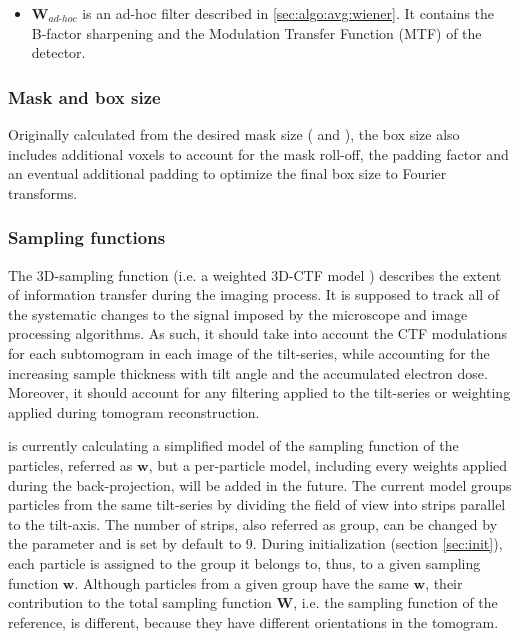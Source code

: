 \begin{itemize}
    \item $\bm{W}_{ad\text{-}hoc}$ is an ad-hoc filter described in \ref{sec:algo:avg:wiener}. It contains the B-factor sharpening and the Modulation Transfer Function (MTF) of the detector.
\end{itemize}

\subsubsection{Mask and box size} \label{sec:algo:avg:box}

Originally calculated from the desired mask size ( and ), the box size also includes additional voxels to account for the mask roll-off, the padding factor and an eventual additional padding to optimize the final box size to Fourier transforms.

\subsubsection{Sampling functions} \label{sec:algo:avg:SF3D}

The 3D-sampling function (i.e. a weighted 3D-CTF model \cite{bharat_2015}) describes the extent of information transfer during the imaging process. It is supposed to track all of the systematic changes to the signal imposed by the microscope and image processing algorithms. As such, it should take into account the CTF modulations for each subtomogram in each image of the tilt-series, while accounting for the increasing sample thickness with tilt angle and the accumulated electron dose. Moreover, it should account for any filtering applied to the tilt-series or weighting applied during tomogram reconstruction.

{\emClarity} is currently calculating a simplified model of the sampling function of the particles, referred as $\bm{w}$, but a per-particle model, including every weights applied during the back-projection, will be added in the future. The current model groups particles from the same tilt-series by dividing the field of view into strips parallel to the tilt-axis. The number of strips, also referred as group, can be changed by the  parameter and is set by default to 9. During initialization (section \ref{sec:init}), each particle is assigned to the group it belongs to, thus, to a given sampling function $\bm{w}$. Although particles from a given group have the same $\bm{w}$, their contribution to the total sampling function $\bm{W}$, i.e. the sampling function of the reference, is different, because they have different orientations in the tomogram.

